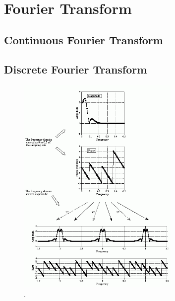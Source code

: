 \documentclass[a4paper,12pt]{article}
\begin{document}
\section{Fourier Transform}

\subsection{Continuous Fourier Transform}

\subsection{Discrete Fourier Transform}
\begin{figure}[ht]
  \label{fig:F_10_9}
  \centering
	\includegraphics[width=0.7\textwidth, keepaspectratio=true]{F_10_9}
	\caption{.}
\end{figure}
\end{document}

